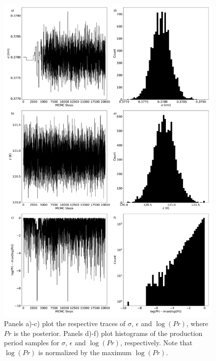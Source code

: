 \documentclass[journal=jctc,manuscript=article]{achemso}
\begin{document}
\begin{figure}[p!]
	\centering
	\includegraphics[width=5.4in]{MCMC_supporting_information}
	\caption{Panels a)-c) plot the respective traces of $\sigma$, $\epsilon$ and $\log(Pr)$, where $Pr$ is the posterior. Panels d)-f) plot histograms of the production period samples for $\sigma$, $\epsilon$ and $\log(Pr)$, respectively. Note that $\log(Pr)$ is normalized by the maximum $\log(Pr)$.}
	\label{fig:MCMC_supporting_information}
\end{figure} 

\end{document}
